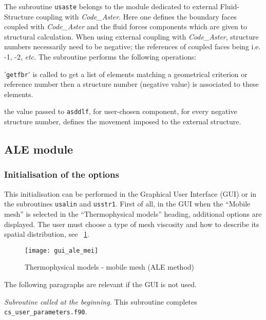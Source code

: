 {{The subroutine \texttt{usaste} belongs to the module dedicated to external
 Fluid-Structure coupling with \textit{Code\_Aster}. Here one defines the boundary
 faces coupled with \textit{Code\_Aster} and the fluid forces components which are
 given to structural calculation. When using external coupling with \textit{Code\_Aster},
 structure numbers necessarily need to be negative; the references of coupled faces being
 i.e. -1, -2, \emph{etc.}
The subroutine performs the following operations:
\begin{list}{-}{}
 \item '\texttt{getfbr}' is called to get a list of elements matching a
geometrical criterion or reference number then a structure number (negative value) is associated
 to these elements.
 \item the value passed to \texttt{asddlf}, for user-chosen component, for every negative
 structure number, defines the movement imposed to the external structure.
\end{list}

\subsection{ALE module}
\subsubsection{Initialisation of the options}
\label{prg_usalin}%
This initialisation can be performed in the Graphical User Interface (GUI)
 or in the subroutines \texttt{usalin} and \texttt{usstr1}. First of all,
 in the GUI when the ``Mobile mesh'' is selected in the ``Thermophysical models''
 heading, additional options are displayed. The user must choose a type of mesh
 viscosity and how to describe its spatial distribution, see \figurename~\ref{fig:Ini-ale}.

\begin{figure}[ht]
\begin{center}
\texttt{[image: gui\_ale\_mei]}
\caption{Thermophysical models - mobile mesh (ALE method)}
\label{fig:Ini-ale}
\end{center}
\end{figure}

The following paragraphs are relevant if the GUI is not used.

\noindent
\textit{Subroutine called at the beginning.}
This subroutine completes \texttt{cs\_user\_parameters.f90}.

}}
